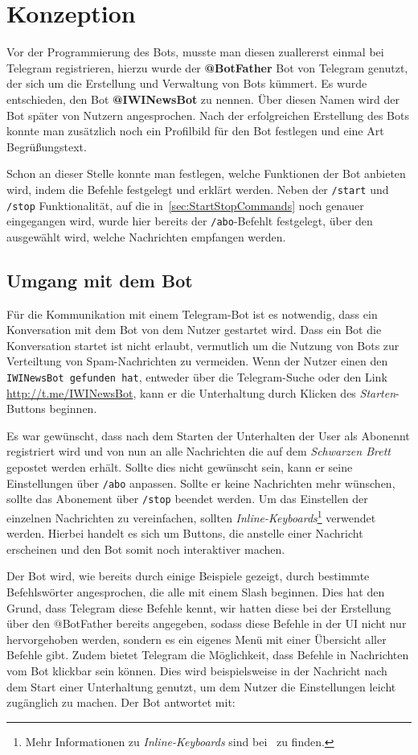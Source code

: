 \chapter{Konzeption}
Vor der Programmierung des Bots, musste man diesen zuallererst einmal bei Telegram registrieren, hierzu wurde der \textbf{@BotFather} Bot von Telegram genutzt, der sich um die Erstellung und Verwaltung von Bots kümmert. Es wurde entschieden, den Bot \textbf{@IWINewsBot} zu nennen. Über diesen Namen wird der Bot später von Nutzern angesprochen. Nach der erfolgreichen Erstellung des Bots konnte man zusätzlich noch ein Profilbild für den Bot festlegen und eine Art Begrüßungstext.

Schon an dieser Stelle konnte man festlegen, welche Funktionen der Bot anbieten wird, indem die Befehle festgelegt und erklärt werden. Neben der \texttt{/start} und \texttt{/stop} Funktionalität, auf die in~\autoref{sec:StartStopCommands} noch genauer eingegangen wird, wurde hier bereits der \texttt{/abo}-Befehlt festgelegt, über den ausgewählt wird, welche Nachrichten empfangen werden.

\section{Umgang mit dem Bot}
Für die Kommunikation mit einem Telegram-Bot ist es notwendig, dass ein Konversation mit dem Bot von dem Nutzer gestartet wird. Dass ein Bot die Konversation startet ist nicht erlaubt, vermutlich um die Nutzung von Bots zur Verteiltung von Spam-Nachrichten zu vermeiden. Wenn der Nutzer einen den \texttt{IWINewsBot gefunden hat}, entweder über die Telegram-Suche oder den Link \url{http://t.me/IWINewsBot}, kann er die Unterhaltung durch Klicken des \textit{Starten}-Buttons beginnen.

Es war gewünscht, dass nach dem Starten der Unterhalten der User als Abonennt registriert wird und von nun an alle Nachrichten die auf dem \emph{Schwarzen Brett} gepostet werden erhält. Sollte dies nicht gewünscht sein, kann er seine Einstellungen über \texttt{/abo} anpassen. Sollte er keine Nachrichten mehr wünschen, sollte das Abonement über \texttt{/stop} beendet werden. Um das Einstellen der einzelnen Nachrichten zu vereinfachen, sollten \emph{Inline-Keyboards}\footnote{Mehr Informationen zu \emph{Inline-Keyboards} sind bei~\cite{InlineKeyboards} zu finden.} verwendet werden. Hierbei handelt es sich um Buttons, die anstelle einer Nachricht erscheinen und den Bot somit noch interaktiver machen.

Der Bot wird, wie bereits durch einige Beispiele gezeigt, durch bestimmte Befehlswörter angesprochen, die alle mit einem Slash beginnen. Dies hat den Grund, dass Telegram diese Befehle kennt, wir hatten diese bei der Erstellung über den @BotFather bereits angegeben, sodass diese Befehle in der UI nicht nur hervorgehoben werden, sondern es ein eigenes Menü mit einer Übersicht aller Befehle gibt. Zudem bietet Telegram die Möglichkeit, dass Befehle in Nachrichten vom Bot klickbar sein können. Dies wird beispielsweise in der Nachricht nach dem Start einer Unterhaltung genutzt, um dem Nutzer die Einstellungen leicht zugänglich zu machen. Der Bot antwortet mit:

